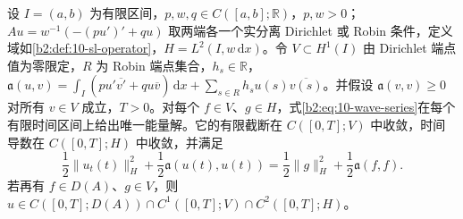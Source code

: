 \begin{theorem}[波动问题的能量极限]\label{b2:thm:10-wave-energy-limit}
设 \(I=(a,b)\) 为有限区间，\(p,w,q\in C([a,b];\mathbb R)\)，\(p,w>0\)；\(Au=w^{-1}(-(pu')'+qu)\) 取两端各一个实分离 Dirichlet 或 Robin 条件，定义域如\cref{b2:def:10-sl-operator}，\(H=L^2(I,w\,\mathrm dx)\)。令 \(V\subset H^1(I)\) 由 Dirichlet 端点值为零限定，\(R\) 为 Robin 端点集合，\(h_s\in\mathbb R\)，\(\mathfrak a(u,v)=\int_I(pu'\overline{v'}+qu\overline v)\,\mathrm dx+\sum_{s\in R}h_su(s)\overline{v(s)}\)。并假设 \(\mathfrak a(v,v)\geq0\) 对所有 \(v\in V\) 成立，\(T>0\)。对每个 \(f\in V\)、\(g\in H\)，式\eqref{b2:eq:10-wave-series}在每个有限时间区间上给出唯一能量解。它的有限截断在 \(C([0,T];V)\) 中收敛，时间导数在 \(C([0,T];H)\) 中收敛，并满足
\begin{equation}\label{b2:eq:10-wave-energy}
 \dfrac12\|u_t(t)\|_H^2+\dfrac12\mathfrak a(u(t),u(t))
 =\dfrac12\|g\|_H^2+\dfrac12\mathfrak a(f,f).
\end{equation}
若再有 \(f\in D(A)\)、\(g\in V\)，则 \(u\in C([0,T];D(A))\cap C^1([0,T];V)\cap C^2([0,T];H)\)。
\end{theorem}
